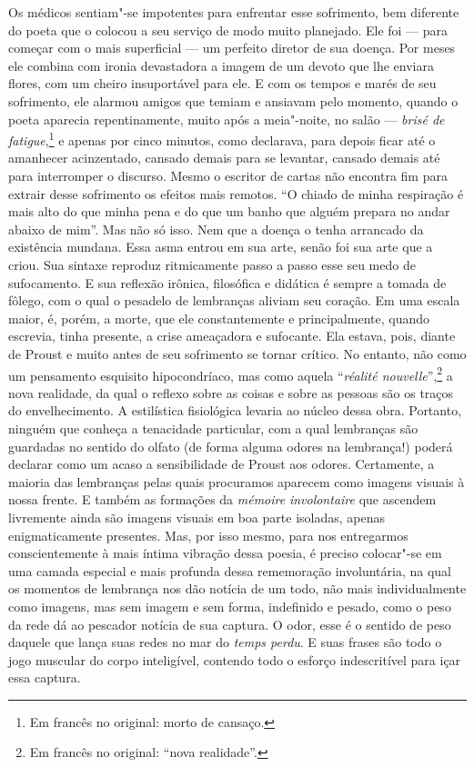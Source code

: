 Os médicos sentiam"-se impotentes para enfrentar esse sofrimento, bem
diferente do poeta que o colocou a seu serviço de modo muito planejado.
Ele foi --- para começar com o mais superficial --- um perfeito diretor de
sua doença. Por meses ele combina com ironia devastadora a imagem de um
devoto que lhe enviara flores, com um cheiro insuportável para ele. E
com os tempos e marés de seu sofrimento, ele alarmou amigos que temiam e
ansiavam pelo momento, quando o poeta aparecia repentinamente, muito
após a meia"-noite, no salão --- \emph{brisé de fatigue},\footnote{Em francês no original:
  morto de cansaço. \versal{[N. T.]}} e apenas por cinco minutos, como declarava, para
depois ficar até o amanhecer acinzentado, cansado demais para se
levantar, cansado demais até para interromper o discurso. Mesmo o
escritor de cartas não encontra fim para extrair desse sofrimento os
efeitos mais remotos. ``O chiado de minha respiração é mais alto do que
minha pena e do que um banho que alguém prepara no andar abaixo de
mim''. Mas não só isso. Nem que a doença o tenha arrancado da existência
mundana. Essa asma entrou em sua arte, senão foi sua arte que a criou.
Sua sintaxe reproduz ritmicamente passo a passo esse seu medo de
sufocamento. E sua reflexão irônica, filosófica e didática é sempre a
tomada de fôlego, com o qual o pesadelo de lembranças aliviam seu
coração. Em uma escala maior, é, porém, a morte, que ele constantemente
e principalmente, quando escrevia, tinha presente, a crise ameaçadora e
sufocante. Ela estava, pois, diante de Proust e muito antes de seu
sofrimento se tornar crítico. No entanto, não como um pensamento
esquisito hipocondríaco, mas como aquela ``\emph{réalité nouvelle}'',\footnote{Em francês no original: ``nova realidade''. \versal{[N. T.]}} a nova realidade,
da qual o reflexo sobre as coisas e sobre as pessoas são os traços do
envelhecimento. A estilística fisiológica levaria ao núcleo dessa obra.
Portanto, ninguém que conheça a tenacidade particular, com a qual
lembranças são guardadas no sentido do olfato (de forma alguma odores na
lembrança!) poderá declarar como um acaso a sensibilidade de Proust aos
odores. Certamente, a maioria das lembranças pelas quais procuramos
aparecem como imagens visuais à nossa frente. E também as formações da
\emph{mémoire} \emph{involontaire} que ascendem livremente ainda são
imagens visuais em boa parte isoladas, apenas enigmaticamente presentes.
Mas, por isso mesmo, para nos entregarmos conscientemente à mais íntima
vibração dessa poesia, é preciso colocar"-se em uma camada especial e
mais profunda dessa rememoração involuntária, na qual os momentos de
lembrança nos dão notícia de um todo, não mais individualmente como
imagens, mas sem imagem e sem forma, indefinido e pesado, como o peso da
rede dá ao pescador notícia de sua captura. O odor, esse é o sentido de
peso daquele que lança suas redes no mar do \emph{temps perdu}. E suas
frases são todo o jogo muscular do corpo inteligível, contendo todo o
esforço indescritível para içar essa captura.

